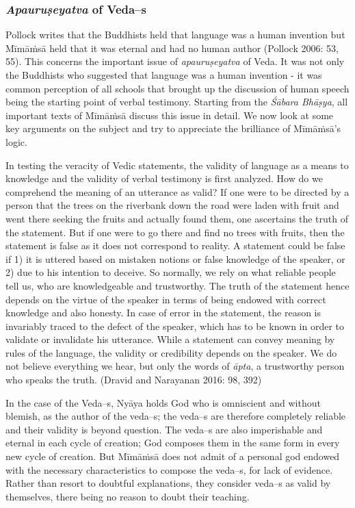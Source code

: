 \vspace{-.3cm}

\subsubsection*{\textit{Apauruṣeyatva} of Veda--s}

Pollock writes that the Buddhists held that language was a human invention but Mīmāṁsā held that it was eternal and had no human author (Pollock 2006: 53, 55). This concerns the important issue of \textit{apauruṣeyatva} of Veda. It was not only the Buddhists who suggested that language was a human invention - it was common perception of all schools that brought up the discussion of human speech being the starting point of verbal testimony. Starting from the \textit{Śābara Bhāṣya}, all important texts of Mīmāṁsā discuss this issue in detail. We now look at some key arguments on the subject and try to appreciate the brilliance of Mīmāṁsā’s logic.

In testing the veracity of Vedic statements, the validity of language as a means to knowledge and the validity of verbal testimony is first analyzed. How do we comprehend the meaning of an utterance as valid? If one were to be directed by a person that the trees on the riverbank down the road were laden with fruit and went there seeking the fruits and actually found them, one ascertains the truth of the statement. But if one were to go there and find no trees with fruits, then the statement is false as it does not correspond to reality. A statement could be false if 1) it is uttered based on mistaken notions or false knowledge of the speaker, or 2) due to his intention to deceive. So normally, we rely on what reliable people tell us, who are knowledgeable and trustworthy. The truth of the statement hence depends on the virtue of the speaker in terms of being endowed with correct knowledge and also honesty. In case of error in the statement, the reason is invariably traced to the defect of the speaker, which has to be known in order to validate or invalidate his utterance. While a statement can convey meaning by rules of the language, the validity or credibility depends on the speaker. We do not believe everything we hear, but only the words of \textit{āpta}, a trustworthy person who speaks the truth. (Dravid and Narayanan 2016: 98, 392)

In the case of the Veda--s, {Nyāya} holds God who is omniscient and without blemish, as the author of the veda--s; the veda--s are therefore completely reliable and their validity is beyond question. The veda--s are also imperishable and eternal in each cycle of creation; God composes them in the same form in every new cycle of creation. But Mīmāṁsā does not admit of a personal god endowed with the necessary characteristics to compose the veda--s, for lack of evidence. Rather than resort to doubtful explanations, they consider veda--s as valid by themselves, there being no reason to doubt their teaching.

